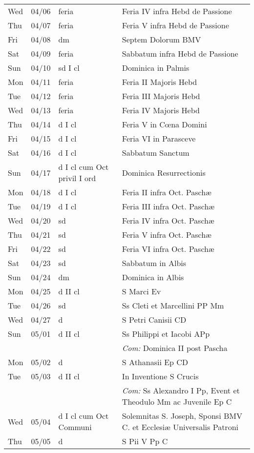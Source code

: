 \documentclass[10pt]{article}
\begin{document}
\begin{longtable}{ l l l l }
Wed & 04/06 & feria & Feria IV infra Hebd de Passione\\
Thu & 04/07 & feria & Feria V infra Hebd de Passione\\
Fri & 04/08 & dm & Septem Dolorum BMV\\
Sat & 04/09 & feria & Sabbatum infra Hebd de Passione\\
Sun & 04/10 & sd I cl & Dominica in Palmis\\
Mon & 04/11 & feria & Feria II Majoris Hebd\\
Tue & 04/12 & feria & Feria III Majoris Hebd\\
Wed & 04/13 & feria & Feria IV Majoris Hebd\\
Thu & 04/14 & d I cl & Feria V in Cœna Domini\\
Fri & 04/15 & d I cl & Feria VI in Parasceve\\
Sat & 04/16 & d I cl & Sabbatum Sanctum\\
Sun & 04/17 & d I cl cum Oct privil I ord & Dominica Resurrectionis\\
Mon & 04/18 & d I cl & Feria II infra Oct. Paschæ\\
Tue & 04/19 & d I cl & Feria III infra Oct. Paschæ\\
Wed & 04/20 & sd & Feria IV infra Oct. Paschæ\\
Thu & 04/21 & sd & Feria V infra Oct. Paschæ\\
Fri & 04/22 & sd & Feria VI infra Oct. Paschæ\\
Sat & 04/23 & sd & Sabbatum in Albis\\
Sun & 04/24 & dm & Dominica in Albis\\
Mon & 04/25 & d II cl & S Marci Ev\\
Tue & 04/26 & sd & Ss Cleti et Marcellini PP Mm\\
Wed & 04/27 & d & S Petri Canisii CD\\
Sun & 05/01 & d II cl & Ss Philippi et Iacobi APp\\
 & & & \textit{Com:} Dominica II post Pascha\\
Mon & 05/02 & d & S Athanasii Ep CD\\
Tue & 05/03 & d II cl & In Inventione S Crucis\\
 & & & \textit{Com:} Ss Alexandro I Pp, Event et Theodulo Mm ac Juvenile Ep C\\
Wed & 05/04 & d I cl cum Oct Communi & Solemnitas S. Joseph, Sponsi BMV C. et Ecclesiæ Universalis Patroni\\
Thu & 05/05 & d & S Pii V Pp C\\

\end{longtable}
\end{document}
